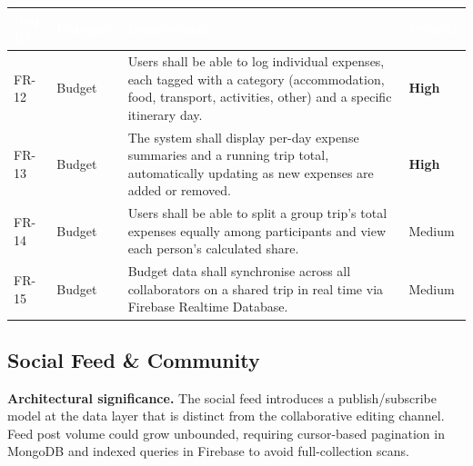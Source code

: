 \documentclass[12pt, a4paper]{article}
\newcommand{\reqid}[1]{\textsc{\small #1}}
\newcommand{\high}{\textbf{High}}
\newcommand{\medium}{Medium}
\newcommand{\thcell}[1]{\textcolor{white}{\textbf{\small #1}}}
\begin{document}
\vspace{0.4em}
\begin{longtable}{C{1.6cm} C{2.0cm} L{8.2cm} C{1.8cm}}
\toprule
{}
\thcell{Req ID} & \thcell{Category} & \thcell{Requirement} & \thcell{Priority} \\
\midrule
\endhead
\bottomrule
\endfoot

\reqid{FR-12} & Budget &
Users shall be able to log individual expenses, each tagged with a category (accommodation, food, transport, activities, other) and a specific itinerary day. &
\high \\

\reqid{FR-13} & Budget &
The system shall display per-day expense summaries and a running trip total, automatically updating as new expenses are added or removed. &
\high \\

\reqid{FR-14} & Budget &
Users shall be able to split a group trip's total expenses equally among participants and view each person's calculated share. &
\medium \\

\reqid{FR-15} & Budget &
Budget data shall synchronise across all collaborators on a shared trip in real time via Firebase Realtime Database. &
\medium \\

\end{longtable}

\subsection{Social Feed \& Community}

\begin{tcolorbox}[notebox]
  \textbf{Architectural significance.} The social feed introduces a publish/subscribe model at the data layer that is distinct from the collaborative editing channel. Feed post volume could grow unbounded, requiring cursor-based pagination in MongoDB and indexed queries in Firebase to avoid full-collection scans.
\end{tcolorbox}
\end{document}
